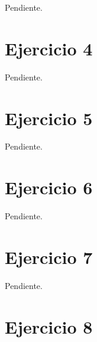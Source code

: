 \documentclass[a4paper,10pt,twoside]{article}
\begin{document}
Pendiente.




\section{Ejercicio 4}

Pendiente.




\section{Ejercicio 5}

Pendiente.




\section{Ejercicio 6}

Pendiente.




\section{Ejercicio 7}

Pendiente.




\section{Ejercicio 8}
\end{document}
